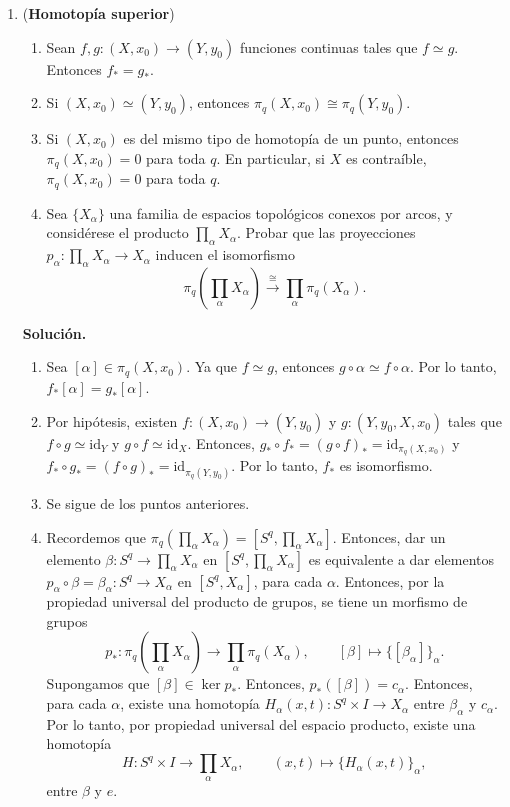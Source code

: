 \documentclass[11pt,a4paper]{article}
\theoremstyle{plain}
\theoremstyle{definition}
\theoremstyle{remark}
\begin{document}
\begin{enumerate}[label=\arabic*.,leftmargin=*]
\item (\textbf{Homotopía superior})
\begin{enumerate}[label=\alph*)]
\item Sean $f,g:(X,x_0)\to(Y,y_0)$ funciones continuas tales que $f\simeq g$.
Entonces $f_*=g_*$.
\item Si $(X,x_0)\simeq(Y,y_0)$, entonces $\pi_q(X,x_0)\cong\pi_q(Y,y_0)$.
\item Si $(X,x_0)$ es del mismo tipo de homotopía de un punto, entonces
$\pi_q(X,x_0)=0$ para toda $q$. En particular, si $X$ es contraíble,
$\pi_q(X,x_0)=0$ para toda $q$.
\item Sea $\{X_\alpha\}$ una familia de espacios topológicos conexos por
arcos, y considérese el producto $\prod_\alpha X_\alpha$. Probar que las
proyecciones $p_\alpha:\prod_\alpha X_\alpha\to X_\alpha$ inducen el
isomorfismo
\[
\pi_q\left(\prod_\alpha X_\alpha\right)\overset{\cong}{\to}\prod_\alpha\pi_q(X_\alpha).
\]
\end{enumerate}

\noindent\textbf{Solución.}
\begin{enumerate}[label=\alph*)]
\item Sea $[\alpha]\in\pi_q(X,x_0)$. Ya que $f\simeq g$, entonces
$g\circ\alpha\simeq f\circ\alpha$. Por lo tanto, $f_*[\alpha]=g_*[\alpha]$.
\item Por hipótesis, existen $f:(X,x_0)\to(Y,y_0)$ y $g:(Y,y_0,X,x_0)$
tales que $f\circ g\simeq\mathrm{id}_Y$ y $g\circ f\simeq\mathrm{id}_X$.
Entonces, $g_*\circ f_*=(g\circ f)_*=\mathrm{id}_{\pi_q(X,x_0)}$ y
$f_*\circ g_*=(f\circ g)_*=\mathrm{id}_{\pi_q(Y,y_0)}$. Por lo tanto, $f_*$
es isomorfismo.
\item Se sigue de los puntos anteriores.
\item Recordemos que $\pi_q\left(\prod_\alpha X_\alpha\right)=\left[S^q,\prod_\alpha X_\alpha\right]$.
Entonces, dar un elemento $\beta:S^q\to\prod_\alpha X_\alpha$ en
$[S^q,\prod_\alpha X_\alpha]$ es equivalente a dar elementos
$p_\alpha\circ\beta=\beta_\alpha:S^q\to X_\alpha$ en $[S^q,X_\alpha]$, para
cada $\alpha$. Entonces, por la propiedad universal del producto de grupos,
se tiene un morfismo de grupos
\[
p_*:\pi_q\left(\prod_\alpha X_\alpha\right)\to\prod_\alpha\pi_q(X_\alpha), \qquad
[\beta]\mapsto\{[\beta_\alpha]\}_\alpha.
\]
Supongamos que $[\beta]\in\ker p_*$. Entonces, $p_*([\beta])=c_\alpha$.
Entonces, para cada $\alpha$, existe una homotopía
$H_\alpha(x,t):S^q\times I\to X_\alpha$ entre $\beta_\alpha$ y $c_\alpha$.
Por lo tanto, por propiedad universal del espacio producto, existe una
homotopía
\[
H:S^q\times I\to\prod_\alpha X_\alpha, \qquad (x,t)\mapsto\{H_\alpha(x,t)\}_\alpha,
\]
entre $\beta$ y $e$.
\end{enumerate}


\end{enumerate}
\end{document}
